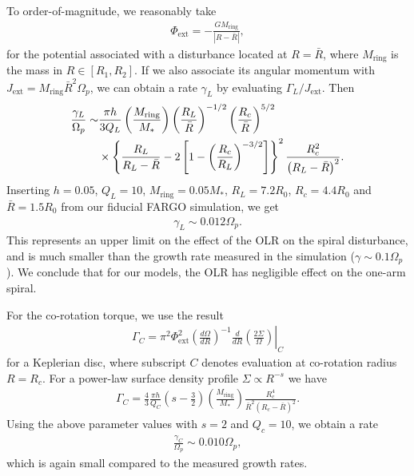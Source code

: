 To order-of-magnitude, we reasonably take
\begin{align}
  \Phi_\mathrm{ext} = -\frac{GM_\mathrm{ring}}{|R - \bar{R}|}, 
\end{align}
for the potential associated with a disturbance located at
$R=\bar{R}$, where $M_\mathrm{ring}$ is the mass in $R\in[R_1,R_2]$.
If we also associate its angular momentum with 
$J_\mathrm{ext}  = M_\mathrm{ring}\bar{R}^2\Omega_p$, we can obtain a
rate $\gamma_L$ by evaluating $\Gamma_L/J_\mathrm{ext}$. Then 
\begin{align}
  \frac{\gamma_L}{\Omega_p} \sim &\frac{\pi h}{3
    Q_L}\left(\frac{M_\mathrm{ring}}{M_*}\right)\left(\frac{R_L}{\bar{R}}\right)^{-1/2}\left(\frac{R_c}{\bar{R}}\right)^{5/2}\notag\\
  &\times \left\{ \frac{R_L}{R_L - \bar{R}} - 2\left[1 -
      \left(\frac{R_c}{R_L}\right)^{-3/2}\right]\right\}^2\frac{R_c^2}{\left(R_L
    - \bar{R}\right)^2}. 
\end{align}
Inserting $h=0.05$, $Q_L=10$, $M_\mathrm{ring} = 0.05M_*$,
$R_L=7.2R_0$, $R_c=4.4R_0$ and $\bar{R}=1.5R_0$ from our fiducial
FARGO simulation, we get
\begin{align}
  \gamma_L \sim 0.012\Omega_p. 
\end{align}
This represents an upper limit on the effect of the OLR on the spiral
disturbance, and is much smaller than the growth rate measured in the
simulation ($\gamma\sim0.1\Omega_p$). We conclude that for our models,
the OLR has negligible effect on the one-arm spiral. 

For the co-rotation torque, we use the result
\begin{align}
  \Gamma_C = \left.
    \pi^2\Phi_\mathrm{ext}^2\left(\frac{d\Omega}{dR}\right)^{-1}\frac{d}{dR}\left(\frac{2\Sigma}{\Omega}\right)\right|_{C}
\end{align}
for a Keplerian disc, where subscript $C$ denotes evaluation at
co-rotation radius $R=R_c$. For a power-law surface density profile
$\Sigma\propto R^{-s}$ we have
\begin{align}
  \Gamma_C = \frac{4}{3}\frac{\pi h}{Q_C} \left(s -
    \frac{3}{2}\right)\left(\frac{M_\mathrm{ring}}{M_*}\right)\frac{R_c^4}{\bar{R}^2\left(R_c
      - \bar{R}\right)^2}.   
\end{align}
Using the above parameter values with $s=2$ and $Q_c=10$, we obtain a
rate
\begin{align}
  \frac{\gamma_C}{\Omega_p} \sim 0.010\Omega_p,
\end{align}
which is again small compared to the measured growth rates. 

